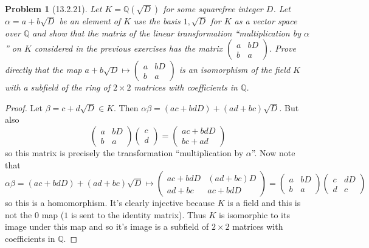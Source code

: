 \documentclass{article}
\newtheorem{problem}{Problem}
\begin{document}
\begin{problem}[13.2.21]
Let $K = \mathbb{Q}(\sqrt{D})$ for some squarefree integer $D$. Let $\alpha = a + b \sqrt{D}$ be an element of $K$ use the basis $1, \sqrt{D}$ for $K$ as a vector space over $\mathbb{Q}$ and show that the matrix of the linear transformation ``multiplication by $\alpha$'' on $K$ considered in the previous exercises has the matrix $\left ( \begin{array}{cc} a & bD\\ b & a \end{array} \right )$. Prove directly that the map $a + b \sqrt{D} \mapsto \left ( \begin{array}{cc} a & bD\\ b & a \end{array} \right )$ is an isomorphism of the field $K$ with a subfield of the ring of $2 \times 2$ matrices with coefficients in $\mathbb{Q}$.
\end{problem}
\begin{proof}
Let $\beta = c + d \sqrt{D} \in K$. Then $\alpha \beta = (ac + bdD) + (ad + bc) \sqrt{D}$. But also
\[
\left (
\begin{array}{cc}
a & bD\\
b & a
\end{array}
\right )
\left (
\begin{array}{c}
c\\
d
\end{array}
\right )
=
\left (
\begin{array}{c}
ac + bdD\\
bc + ad
\end{array}
\right)
\]
so this matrix is precisely the transformation ``multiplication by $\alpha$''. Now note that
\[
\alpha \beta = (ac + bdD) + (ad + bc) \sqrt{D} \mapsto \left (
\begin{array}{cc}
ac + bdD & (ad + bc) D\\
ad + bc & ac + bdD
\end{array}
\right )
=
\left (
\begin{array}{cc}
a & bD\\
b & a
\end{array}
\right )
\left (
\begin{array}{cc}
c & dD\\
d & c
\end{array}
\right )
\]
so this is a homomorphism. It's clearly injective because $K$ is a field and this is not the $0$ map ($1$ is sent to the identity matrix). Thus $K$ is isomorphic to its image under this map and so it's image is a subfield of $2 \times 2$ matrices with coefficients in $\mathbb{Q}$.
\end{proof}
\end{document}
